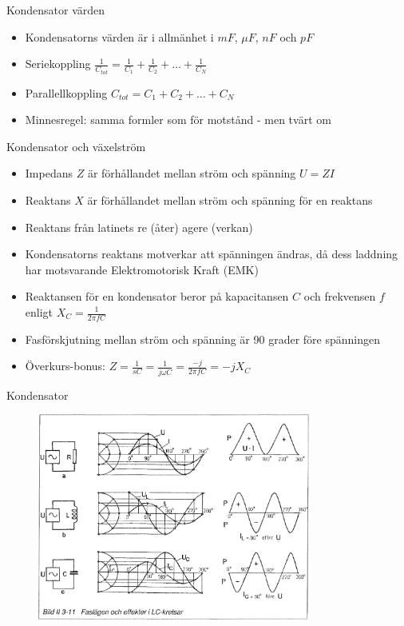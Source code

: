 \documentclass{beamer}
\begin{document}
\begin{frame}{Kondensator värden}
  \begin{itemize}
    \item Kondensatorns värden är i allmänhet i $mF$, $\mu F$, $nF$ och $pF$
    \item Seriekoppling $\frac{1}{C_{tot}} = \frac{1}{C_1} + \frac{1}{C_2} + \ldots + \frac{1}{C_N}$
    \item Parallellkoppling $C_{tot} = C_1 + C_2 + \ldots + C_N$
    \item Minnesregel: samma formler som för motstånd - men tvärt om
  \end{itemize}
\end{frame}

\begin{frame}{Kondensator och växelström}
  \begin{itemize}
  \item Impedans $Z$ är förhållandet mellan ström och spänning $U=ZI$
  \item Reaktans $X$ är förhållandet mellan ström och spänning för en reaktans
  \item Reaktans från latinets re (åter) agere (verkan)
  \item Kondensatorns reaktans motverkar att spänningen ändras, då dess laddning har motsvarande Elektromotorisk Kraft (EMK)
  \item Reaktansen för en kondensator beror på kapacitansen $C$ och frekvensen $f$ enligt $X_C = \frac{1}{2\pi f C}$
  \item Fasförskjutning mellan ström och spänning är 90 grader före spänningen
  \item Överkurs-bonus: $Z = \frac{1}{sC} = \frac{1}{j\omega C} = \frac{-j}{2\pi f C} = -jX_C$ 
  \end{itemize}
\end{frame}

\begin{frame}{Kondensator}

\begin{figure}[h]
\includegraphics[width=0.8\textwidth]{images/bild_2_3-11}
\end{figure}

\end{frame}
\end{document}
